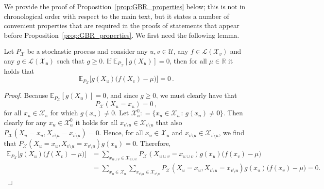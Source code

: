 \documentclass[twoside,11pt]{article}
\newcommand{\reals}{\mathbb{R}}
\newcommand{\states}{\mathcal{X}}
\newcommand{\gambles}{\mathcal{L}}
\newcommand{\coloneqq}{:\!=}
\begin{document}
We provide the proof of Proposition~\ref{prop:GBR_properties} below; this is not in chronological order with respect to the main text, but it states a number of convenient properties that are required in the proofs of statements that appear before Proposition~\ref{prop:GBR_properties}. We first need the following lemma.

\begin{lemma}\label{lemma:conditioning_zero_means_bayes_zero}
Let $P_\states$ be a stochastic process and consider any $u,v\in\mathcal{U}$, any $f\in\gambles(\states_v)$ and any $g\in\gambles(\states_u)$ such that $g\geq 0$. If\/ $\mathbb{E}_{P_\states}[g(X_u)]=0$, then for all $\mu\in\reals$ it holds that
\begin{equation*}
\mathbb{E}_{P_\states}\bigl[g(X_u)\bigl(f(X_v) - \mu\bigr)\bigr]=0\,.
\end{equation*}
\end{lemma}
\begin{proof}
Because $\mathbb{E}_{P_\states}[g(X_u)]=0$, and since $g\geq 0$, we must clearly have that
\begin{equation*}
P_\states(X_u=x_u) = 0\,,
\end{equation*}
for all $x_u\in\states_u$ for which $g(x_u)\neq 0$. Let $\states_u^0\coloneqq\{x_u\in\states_u\,:\,g(x_u)\neq 0\}$. Then clearly for any $x_u\in\states_u^0$ it holds for all $x_{v\setminus u}\in\states_{v\setminus u}$ that also $P_\states(X_u=x_u,X_{v\setminus u}=x_{v\setminus u})=0$. Hence, for all $x_u\in\states_u$ and $x_{v\setminus u}\in\states_{v\setminus u}$, we find that $P_\states(X_u=x_u,X_{v\setminus u}=x_{v\setminus u})g(x_u)=0$. Therefore,
\begin{align*}
\mathbb{E}_{P_\states}\bigl[g(X_u)\bigl(f(X_v) - \mu\bigr)\bigr] &= \sum_{x_{u\cup v}\in\states_{u\cup v}} P_\states(X_{u\cup v}=x_{u\cup v})g(x_u)\bigl(f(x_v) - \mu\bigr) \\
 &= \sum_{x_{u}\in\states_{u}}\sum_{x_{v\setminus u}\in\states_{v\setminus u}} P_\states(X_u=x_u,X_{v\setminus u}=x_{v\setminus u})g(x_u)\bigl(f(x_v) - \mu\bigr)=0. %
\end{align*}
\end{proof}
\end{document}
